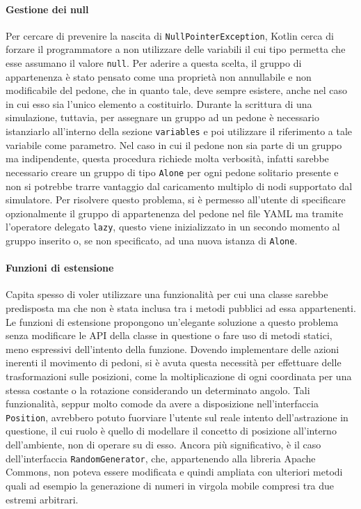 \paragraph{Gestione dei null} Per cercare di prevenire la nascita di \texttt{NullPointerException}, Kotlin cerca di forzare il programmatore a non utilizzare delle variabili il cui tipo permetta che esse assumano il valore \texttt{null}. \newline 
Per aderire a questa scelta, il gruppo di appartenenza è stato pensato come una proprietà non annullabile e non modificabile del pedone, che in quanto tale, deve sempre esistere, anche nel caso in cui esso sia l'unico elemento a costituirlo. \newline
Durante la scrittura di una simulazione, tuttavia, per assegnare un gruppo ad un pedone è necessario istanziarlo all'interno della sezione \texttt{variables} e poi utilizzare il riferimento a tale variabile come parametro.
Nel caso in cui il pedone non sia parte di un gruppo ma indipendente, questa procedura richiede molta verbosità, infatti sarebbe necessario creare un gruppo di tipo \texttt{Alone} per ogni pedone solitario presente e non si potrebbe trarre vantaggio dal caricamento multiplo di nodi supportato dal simulatore. \newline
Per risolvere questo problema, si è permesso all'utente di specificare opzionalmente il gruppo di appartenenza del pedone nel file YAML ma tramite l'operatore delegato \texttt{lazy}, questo viene inizializzato in un secondo momento al gruppo inserito o, se non specificato, ad una nuova istanza di \texttt{Alone}.

\paragraph{Funzioni di estensione} Capita spesso di voler utilizzare una funzionalità per cui una classe sarebbe predisposta ma che non è stata inclusa tra i metodi pubblici ad essa appartenenti. Le funzioni di estensione propongono un'elegante soluzione a questo problema senza modificare le API della classe in questione o fare uso di metodi statici, meno espressivi dell'intento della funzione. \newline 
Dovendo implementare delle azioni inerenti il movimento di pedoni, si è avuta questa necessità per effettuare delle trasformazioni sulle posizioni, come la moltiplicazione di ogni coordinata per una stessa costante o la rotazione considerando un determinato angolo. Tali funzionalità, seppur molto comode da avere a disposizione nell'interfaccia \texttt{Position}, avrebbero potuto fuorviare l'utente sul reale intento dell'astrazione in questione, il cui ruolo è quello di modellare il concetto di posizione all'interno dell'ambiente, non di operare su di esso. \newline
Ancora più significativo, è il caso dell'interfaccia \texttt{RandomGenerator}, che, appartenendo alla libreria Apache Commons, non poteva essere modificata e quindi ampliata con ulteriori metodi quali ad esempio la generazione di numeri in virgola mobile compresi tra due estremi arbitrari.

